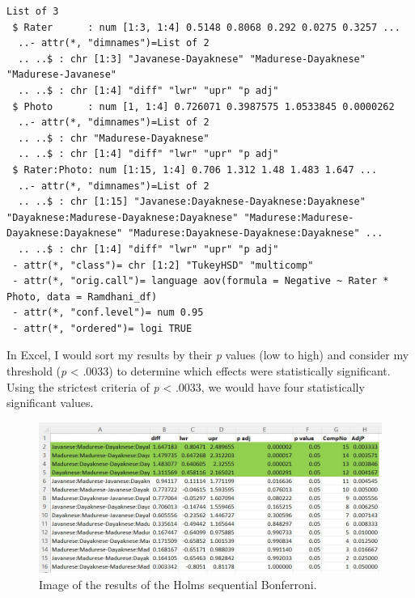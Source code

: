 \documentclass[
  11pt,
]{book}
\newenvironment{Shaded}{\begin{snugshade}}{\end{snugshade}}
\newcommand{\FunctionTok}[1]{\textcolor[rgb]{0.27,0.27,0.27}{\textbf{#1}}}
\newcommand{\NormalTok}[1]{#1}
\newcommand{\SpecialCharTok}[1]{\textcolor[rgb]{0.43,0.43,0.43}{\textbf{#1}}}
\newcommand{\StringTok}[1]{\textcolor[rgb]{0.5,0.5,0.5}{#1}}
\begin{document}
\begin{verbatim}
List of 3
 $ Rater      : num [1:3, 1:4] 0.5148 0.8068 0.292 0.0275 0.3257 ...
  ..- attr(*, "dimnames")=List of 2
  .. ..$ : chr [1:3] "Javanese-Dayaknese" "Madurese-Dayaknese" "Madurese-Javanese"
  .. ..$ : chr [1:4] "diff" "lwr" "upr" "p adj"
 $ Photo      : num [1, 1:4] 0.726071 0.3987575 1.0533845 0.0000262
  ..- attr(*, "dimnames")=List of 2
  .. ..$ : chr "Madurese-Dayaknese"
  .. ..$ : chr [1:4] "diff" "lwr" "upr" "p adj"
 $ Rater:Photo: num [1:15, 1:4] 0.706 1.312 1.48 1.483 1.647 ...
  ..- attr(*, "dimnames")=List of 2
  .. ..$ : chr [1:15] "Javanese:Dayaknese-Dayaknese:Dayaknese" "Dayaknese:Madurese-Dayaknese:Dayaknese" "Madurese:Madurese-Dayaknese:Dayaknese" "Madurese:Dayaknese-Dayaknese:Dayaknese" ...
  .. ..$ : chr [1:4] "diff" "lwr" "upr" "p adj"
 - attr(*, "class")= chr [1:2] "TukeyHSD" "multicomp"
 - attr(*, "orig.call")= language aov(formula = Negative ~ Rater * Photo, data = Ramdhani_df)
 - attr(*, "conf.level")= num 0.95
 - attr(*, "ordered")= logi TRUE
\end{verbatim}

\begin{Shaded}
\end{Shaded}

In Excel, I would sort my results by their \emph{p} values (low to high) and consider my threshold (\emph{p} \textless{} .0033) to determine which effects were statistically significant. Using the strictest criteria of \emph{p} \textless{} .0033, we would have four statistically significant values.

\begin{figure}
\centering
\includegraphics{images/factorial/Holmsequential.jpg}
\caption{Image of the results of the Holms sequential Bonferroni.}
\end{figure}
\end{document}
